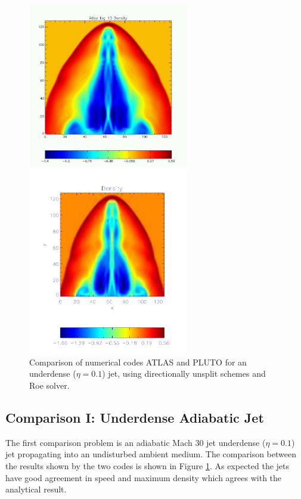 \begin{figure}[t]
\begin{center}
\begin{minipage}[c]{.48\linewidth}
\includegraphics[width=7cm]{atlas_comparison_jet1}
\end{minipage} \hfill
\begin{minipage}[c]{.48\linewidth}
\includegraphics[width=7cm]{pluto_comparison}
\end{minipage} \hfill
\caption{
Comparison of numerical codes ATLAS and PLUTO for an underdense ($\eta=0.1$) jet, using directionally unsplit schemes and Roe solver.
}
\label{fig:compjet1} %
\end{center}
\end{figure}

\subsection{Comparison I: Underdense Adiabatic Jet}
The first comparison problem is an adiabatic Mach 30 jet underdense ($\eta = 0.1$) jet propagating into an undisturbed ambient medium. 
The comparison between the results shown by the two codes is shown in Figure \ref{fig:compjet1}.
As expected the jets have good agreement in speed and maximum density which agrees with the analytical result.


